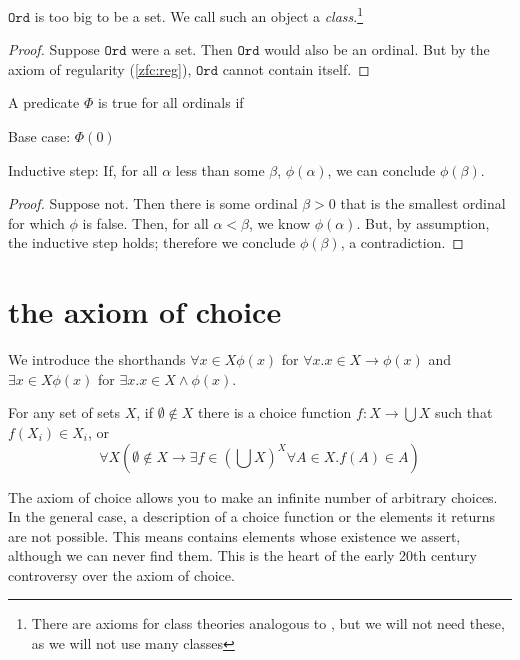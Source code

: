 \documentclass{scrbook}
\renewcommand{\implies}{\to}
\newcommand{\ord}{\mathtt{Ord}}
\begin{document}
\begin{theorem}[$\ord$ is too big to be a set]\label{th:ord-proper-class}
  $\ord$ is too big to be a set. We call such an object a \emph{class}.\footnote{There are axioms for class theories analogous to \zfc, but we will not need these, as we will not use many classes}
\end{theorem}
\begin{proof}
  Suppose $\ord$ were a set. Then $\ord$ would also be an ordinal. But by the axiom of regularity (\ref{zfc:reg}), $\ord$ cannot contain itself. 
\end{proof}
\begin{theorem}\label{def:trans-ind}
  A predicate $\Phi$ is true for all ordinals if
  \begin{trivlist}
  \item Base case: $\Phi(0)$
  \item Inductive step: If, for all $\alpha$ less than some $\beta$, $\phi(\alpha)$, we can conclude $\phi(\beta)$. 
  \end{trivlist}
\end{theorem}
\begin{proof}
  Suppose not. Then there is some ordinal $\beta>0$ that is the smallest ordinal for which $\phi$ is false. Then, for all $\alpha < \beta$, we know $\phi(\alpha)$. But, by assumption, the inductive step holds; therefore we conclude $\phi(\beta)$, a contradiction. 
\end{proof}
\section[The axiom of choice]{the axiom of choice}
We introduce the shorthands $\forall x \in X \phi(x)$ for $\forall x . x\in X \implies \phi(x)$ and $\exists x \in X \phi(x)$ for $\exists x . x\in X \wedge \phi(x)$. 
\begin{defn} \label{choice}
  For any set of sets $X$, if $\emptyset \notin X$ there is a choice function $f:X\to \bigcup X$ such that $f(X_i)\in X_i$, or 
\begin{equation}
\forall X \left(\emptyset \notin X \implies \exists f \in \left(\bigcup X\right)^X \forall A \in X . f(A)\in A\right)
\label{eq:choice}
\end{equation}
\end{defn}
The axiom of choice allows you to make an infinite number of arbitrary choices. In the general case, a description of a choice function or the elements it returns are not possible. This means \zfc contains elements whose existence we assert, although we can never find them. This is the heart of the early 20th century controversy over the axiom of choice. 
\end{document}
